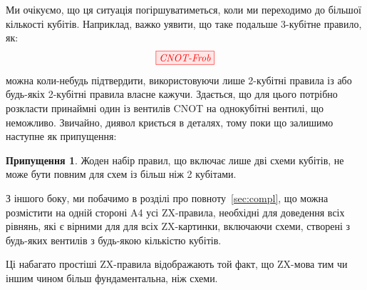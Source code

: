 \documentclass[11pt]{article}
\theoremstyle{definition}
\newtheorem{conj}[theorem]{Припущення}
\def\bR{\begin{color}{red}}
\def\e{\end{color}\xspace}
\newcommand{\TODOb}[1]{\marginpar{\scriptsize\bR \textbf{TODO:} #1\e}}
\begin{document}
Ми очікуємо, що ця ситуація погіршуватиметься, коли ми переходимо до більшої кількості кубітів. Наприклад, важко уявити, що таке подальше 3-кубітне правило, як:
\begin{equation}\label{eq:3qubit}
\tikzfig{CNOT-Frob}
\end{equation}
можна коли-небудь підтвердити, використовуючи лише 2-кубітні правила із \cite{ptbian, DBLP:conf/rc/CoeckeW18} або будь-якіх 2-кубітні правила власне кажучи. Здається, що для цього потрібно розкласти принаймні один із вентилів CNOT на однокубітні вентилі, що неможливо. Звичайно, диявол криється в деталях, тому поки що залишимо наступне як припущення:

\begin{conj}
  Жоден набір правил, що включає лише дві схеми кубітів, не може бути повним для схем із більш ніж 2 кубітами.
\end{conj}

З іншого боку, ми побачимо в розділі про повноту~\ref{sec:compl}, що можна розмістити на одній стороні A4 усі ZX-правила, необхідні для доведення всіх рівнянь, які є вірними для для всіх ZX-картинки, включаючи схеми, створені з будь-яких вентилів з будь-якою кількістю кубітів.



 

Ці набагато простіші ZX-правила відображають той факт, що ZX-мова тим чи іншим чином більш фундаментальна, ніж схеми.

\end{document}
